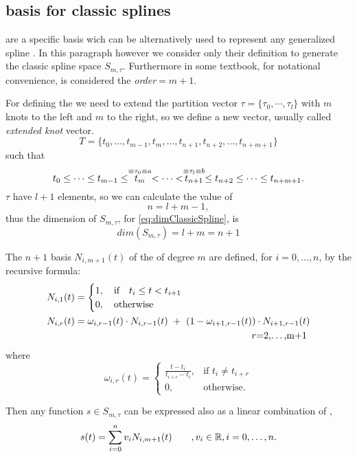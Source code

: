 \documentclass[dissertation.tex]{subfiles}
\begin{document}
\subsection{\bss basis for classic
  splines}\label{sec:bsplines}\index{\bss}
\emph{\bss} are a specific basis wich can be alternatively used to
represent any generalized spline \cite{deboor}\cite{farin}\cite{salomon}\cite{bartels}. In this
paragraph however we consider only their definition to generate the
classic spline space $S_{m,\tau}$. Furthermore in some textbook, for
notational convenience, is considered the
\emph{order}$=m+1$.

For defining the \bss \cite{deboor} we need to extend the partition vector
$\tau=\{\tau_0,\cdots,\tau_l\}$ with $m$ knots to the left and $m$ to
the right, so we define a new vector, usually called \emph{extended knot} vector.
$$
T=\{t_0,\dots,t_{m-1},t_{m},\dots,t_{n+1},t_{n+2},\dots,t_{n+m+1}\}
$$
such that
\begin{equation*}
  t_0\leq\dots\leq t_{m-1}\leq \stackrel{\equiv\tau_0\equiv a}{t_{m}}<\dots<\stackrel{\equiv\tau_l\equiv b}{t_{n+1}}\leq t_{n+2}\leq\dots\leq t_{n+m+1}.    
\end{equation*}
$\tau$ have $l+1$ elements, so we can calculate the value of
$$
n=l+m-1,
$$
thus the dimension of $S_{m,\tau}$, for
\cref{eq:dimClassicSpline}, is 
\begin{equation*}
  dim(S_{m,\tau})=l+m=n+1  
\end{equation*}

The $n+1$ basis $N_{i,m+1}(t)$ of the \bss of degree $m$ are defined,
for $i=0,\dots,n$, by the recursive formula:
\begin{align*}
  N_{i,1}(t) &=
  \begin{cases}
    1,\quad \mbox{if}\quad t_i\leq t<t_{i+1}\\
    0,\quad \mbox{otherwise}
  \end{cases}\\
  N_{i,r}(t) &= \omega_{i,r-1}(t)\cdot N_{i,r-1}(t)\ +\
  (1-\omega_{i+1,r-1}(t))\cdot N_{i+1,r-1}(t)\\
             &\pushright r=2,\dots,m+1
\end{align*}
where
$$
\omega_{i,r}(t) = \begin{cases}
  \frac{t-t_i}{t_{i+r}-t_i},&\mbox{if }t_i\neq t_{i+r}\\
  0, &\mbox{otherwise.}
\end{cases}
$$

Then any function $s\in S_{m,\tau}$ can be expressed also as a linear
combination of \bss,
\begin{equation}\label{eq:bsplineElement}
  s(t)=\sum_{i=0}^nv_i N_{i,m+1}(t)\qquad, v_i\in\mathbb{R}, i=0,\dots,n.
\end{equation}
\end{document}
